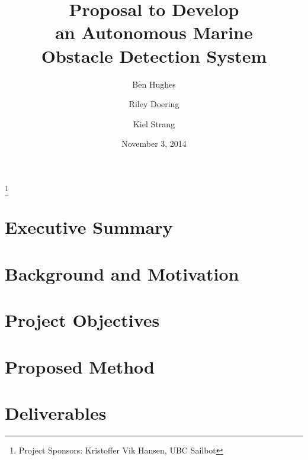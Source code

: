 \documentclass[amsmath, amssymb, aps, pra, 12pt]{revtex4-1}
\begin{document}
\title{Proposal to Develop\\an Autonomous Marine\\Obstacle Detection System}
\author{Ben Hughes}
\thanks{Project Sponsors: Kristoffer Vik Hansen, UBC Sailbot}
\author{Riley Doering}
\author{Kiel Strang}
\date{November 3, 2014}
\maketitle


\section*{Executive Summary}


\newpage
\tableofcontents

\makeatletter
\let\toc@pre\relax
\let\toc@post\relax
\makeatother 

\newpage
\listoffigures
\listoftables

\clearpage
\newpage
{}






\section{\label{sec:intro}Background and Motivation}


\section{\label{sec:objectives}Project Objectives}


\section{\label{sec:method}Proposed Method}


\section{\label{sec:deliverables}Deliverables}

\end{document}
